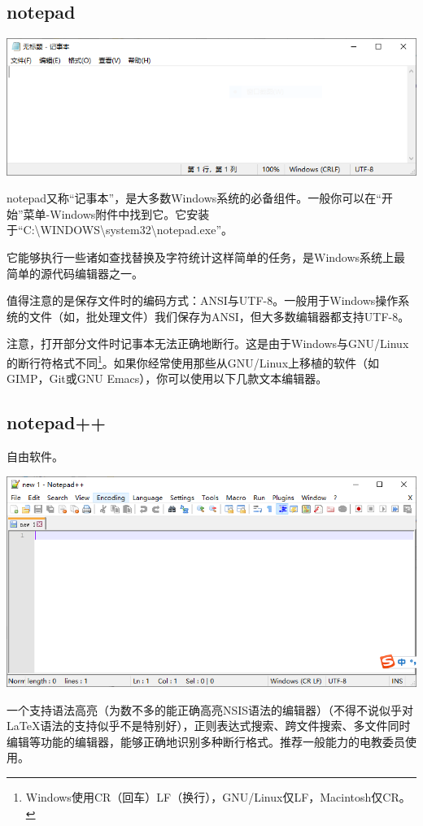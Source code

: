 \documentclass{book}
\begin{document}
\subsection{notepad}
\begin{center}
\includegraphics[scale=0.8]{pic/winnotepad.PNG}	
\end{center}
notepad又称“记事本”，是大多数Windows系统的必备组件。一般你可以在“开始”菜单-Windows附件中找到它。它安装于“C:\textbackslash WINDOWS\textbackslash system32\textbackslash notepad.exe”。\par
它能够执行一些诸如查找替换及字符统计这样简单的任务，是Windows系统上最简单的源代码编辑器之一。\par
值得注意的是保存文件时的编码方式：ANSI与UTF-8。一般用于Windows操作系统的文件（如，批处理文件）我们保存为ANSI，但大多数编辑器都支持UTF-8。\par
注意，打开部分文件时记事本无法正确地断行。这是由于Windows与GNU/Linux的断行符格式不同\footnote{Windows使用CR（回车）LF（换行），GNU/Linux仅LF，Macintosh仅CR。}。如果你经常使用那些从GNU/Linux上移植的软件（如GIMP，Git或GNU Emacs），你可以使用以下几款文本编辑器。
\subsection{notepad++}
自由软件。
\begin{center}
	\includegraphics[scale=0.9]{pic/npp.png}
\end{center}
一个支持语法高亮（为数不多的能正确高亮NSIS语法的编辑器）（不得不说似乎对\LaTeX 语法的支持似乎不是特别好），正则表达式搜索、跨文件搜索、多文件同时编辑等功能的编辑器，能够正确地识别多种断行格式。推荐一般能力的电教委员使用。
\end{document}
